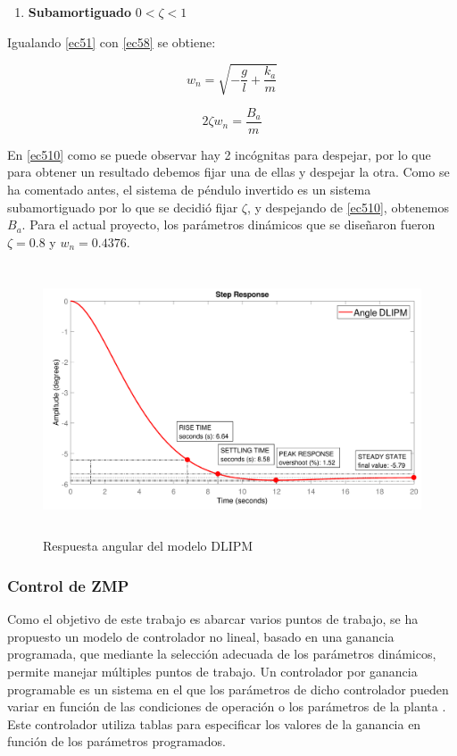 \begin{itemize}
\begin{enumerate}
\item \textbf{Subamortiguado} $0 < \zeta < 1$

\end{enumerate}

Igualando \ref{ec51} con \ref{ec58} se obtiene:

\begin{equation}
w_{n}=\sqrt{-\frac{g}{l}+\frac{k_a}{m}}
\label{ec59}
\end{equation}

\begin{equation}
2\zeta w_{n} = \frac{B_a}{m}
\label{ec510}
\end{equation}

En \ref{ec510} como se puede observar hay 2 incógnitas para despejar, por lo que para obtener un resultado debemos fijar una de ellas y despejar la otra. Como se ha comentado antes, el sistema de péndulo invertido es un sistema subamortiguado por lo que se decidió fijar $\zeta$, y despejando de \ref{ec510}, obtenemos $B_a$. Para el actual proyecto, los parámetros dinámicos que se diseñaron fueron $\zeta = 0.8$ y $w_n = 0.4376$.

\begin{figure}[H]
\centering
\includegraphics[width=13cm, height=8cm]{imagenes/apartado_5/511_step_response}
\caption{Respuesta angular del modelo DLIPM \cite{ref21}}
\label{figura511}
\end{figure}

\end{itemize}


\subsubsection{Control de ZMP}

Como el objetivo de este trabajo es abarcar varios puntos de trabajo, se ha propuesto un modelo de controlador no lineal, basado en una ganancia programada, que mediante la selección adecuada de los parámetros dinámicos, permite manejar múltiples puntos de trabajo. Un controlador por ganancia programable es un sistema en el que los parámetros de dicho controlador pueden variar en función de las condiciones de operación o los parámetros de la planta \cite{ref22}. Este controlador utiliza tablas para especificar los valores de la ganancia en función de los parámetros programados.


